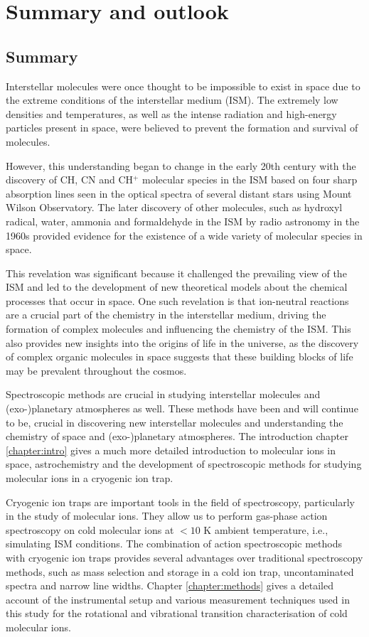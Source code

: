 \chapter{Summary and outlook}

\section{Summary}
Interstellar molecules were once thought to be impossible to exist in space due to the extreme conditions of the interstellar medium (ISM). The extremely low densities and temperatures, as well as the intense radiation and high-energy particles present in space, were believed to prevent the formation and survival of molecules.

However, this understanding began to change in the early 20th century with the discovery of CH, CN and CH$^+$ molecular species in the ISM based on four sharp absorption lines seen in the optical spectra of several distant stars using Mount Wilson Observatory. The later discovery of other molecules, such as hydroxyl radical, water, ammonia and formaldehyde in the ISM by radio astronomy in the 1960s provided evidence for the existence of a wide variety of molecular species in space.

This revelation was significant because it challenged the prevailing view of the ISM and led to the development of new theoretical models about the chemical processes that occur in space. One such revelation is that ion-neutral reactions are a crucial part of the chemistry in the interstellar medium, driving the formation of complex molecules and influencing the chemistry of the ISM. This also provides new insights into the origins of life in the universe, as the discovery of complex organic molecules in space suggests that these building blocks of life may be prevalent throughout the cosmos.

Spectroscopic methods are crucial in studying interstellar molecules and (exo-)planetary atmospheres as well. These methods have been and will continue to be, crucial in discovering new interstellar molecules and understanding the chemistry of space and (exo-)planetary atmospheres. The introduction chapter \ref{chapter:intro} gives a much more detailed introduction to molecular ions in space, astrochemistry and the development of spectroscopic methods for studying molecular ions in a cryogenic ion trap.

Cryogenic ion traps are important tools in the field of spectroscopy, particularly in the study of molecular ions. They allow us to perform gas-phase action spectroscopy on cold molecular ions at $< 10$ K ambient temperature, i.e., simulating ISM conditions. The combination of action spectroscopic methods with cryogenic ion traps provides several advantages over traditional spectroscopy methods, such as mass selection and storage in a cold ion trap, uncontaminated spectra and narrow line widths. Chapter \ref{chapter:methods} gives a detailed account of the instrumental setup and various measurement techniques used in this study for the rotational and vibrational transition characterisation of cold molecular ions.

